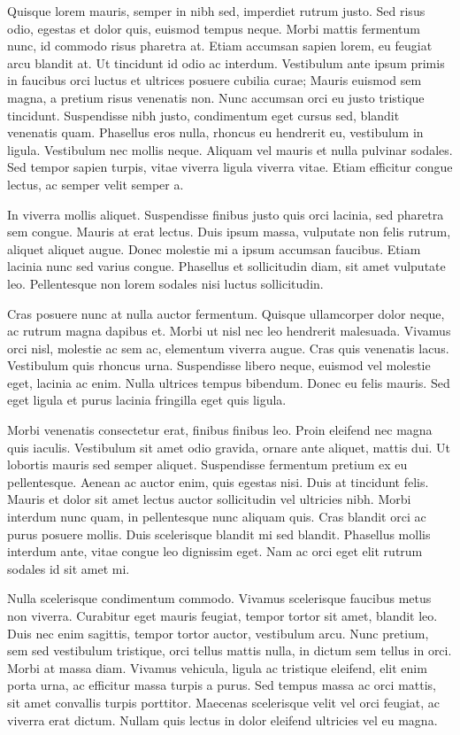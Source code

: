 \documentclass[sigconf]{acmart} %
\begin{document}
Quisque lorem mauris, semper in nibh sed, imperdiet rutrum justo. Sed risus odio, egestas et dolor quis, euismod tempus neque. Morbi mattis fermentum nunc, id commodo risus pharetra at. Etiam accumsan sapien lorem, eu feugiat arcu blandit at. Ut tincidunt id odio ac interdum. Vestibulum ante ipsum primis in faucibus orci luctus et ultrices posuere cubilia curae; Mauris euismod sem magna, a pretium risus venenatis non. Nunc accumsan orci eu justo tristique tincidunt. Suspendisse nibh justo, condimentum eget cursus sed, blandit venenatis quam. Phasellus eros nulla, rhoncus eu hendrerit eu, vestibulum in ligula. Vestibulum nec mollis neque. Aliquam vel mauris et nulla pulvinar sodales. Sed tempor sapien turpis, vitae viverra ligula viverra vitae. Etiam efficitur congue lectus, ac semper velit semper a.

In viverra mollis aliquet. Suspendisse finibus justo quis orci lacinia, sed pharetra sem congue. Mauris at erat lectus. Duis ipsum massa, vulputate non felis rutrum, aliquet aliquet augue. Donec molestie mi a ipsum accumsan faucibus. Etiam lacinia nunc sed varius congue. Phasellus et sollicitudin diam, sit amet vulputate leo. Pellentesque non lorem sodales nisi luctus sollicitudin.

Cras posuere nunc at nulla auctor fermentum. Quisque ullamcorper dolor neque, ac rutrum magna dapibus et. Morbi ut nisl nec leo hendrerit malesuada. Vivamus orci nisl, molestie ac sem ac, elementum viverra augue. Cras quis venenatis lacus. Vestibulum quis rhoncus urna. Suspendisse libero neque, euismod vel molestie eget, lacinia ac enim. Nulla ultrices tempus bibendum. Donec eu felis mauris. Sed eget ligula et purus lacinia fringilla eget quis ligula.

Morbi venenatis consectetur erat, finibus finibus leo. Proin eleifend nec magna quis iaculis. Vestibulum sit amet odio gravida, ornare ante aliquet, mattis dui. Ut lobortis mauris sed semper aliquet. Suspendisse fermentum pretium ex eu pellentesque. Aenean ac auctor enim, quis egestas nisi. Duis at tincidunt felis. Mauris et dolor sit amet lectus auctor sollicitudin vel ultricies nibh. Morbi interdum nunc quam, in pellentesque nunc aliquam quis. Cras blandit orci ac purus posuere mollis. Duis scelerisque blandit mi sed blandit. Phasellus mollis interdum ante, vitae congue leo dignissim eget. Nam ac orci eget elit rutrum sodales id sit amet mi.

Nulla scelerisque condimentum commodo. Vivamus scelerisque faucibus metus non viverra. Curabitur eget mauris feugiat, tempor tortor sit amet, blandit leo. Duis nec enim sagittis, tempor tortor auctor, vestibulum arcu. Nunc pretium, sem sed vestibulum tristique, orci tellus mattis nulla, in dictum sem tellus in orci. Morbi at massa diam. Vivamus vehicula, ligula ac tristique eleifend, elit enim porta urna, ac efficitur massa turpis a purus. Sed tempus massa ac orci mattis, sit amet convallis turpis porttitor. Maecenas scelerisque velit vel orci feugiat, ac viverra erat dictum. Nullam quis lectus in dolor eleifend ultricies vel eu magna.
\end{document}
